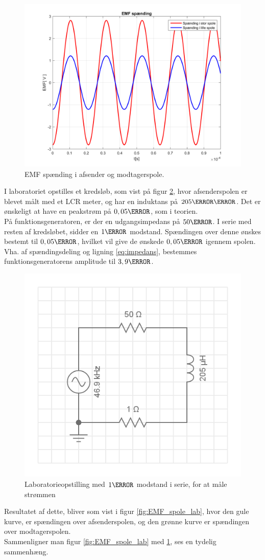 \begin{figure}[h!]
	\centering
	\includegraphics[width=1\textwidth]{billeder/EMF_spanding.png}
	\caption{EMF spænding i afsender og modtagerspole.}
	\label{fig:EMF_spole}
\end{figure}

I laboratoriet opstilles et kredsløb, som vist på figur \ref{fig:kredslob_spole}, hvor afsenderspolen er blevet målt med et LCR meter, og har en induktans på $205\micro\henry$.
Det er ønskeligt at have en peakstrøm på $0,05 \ampere$, som i teorien.\\
På funktionsgeneratoren, er der en udgangsimpedans på $50\ohm$.
I serie med resten af kredsløbet, sidder en $1\ohm$ modstand. Spændingen over denne ønskes bestemt til $0,05\volt$, hvilket vil give de ønskede $0,05\ampere$ igennem spolen.
Vha. af spændingsdeling og ligning \ref{eq:impedans}, bestemmes funktionsgeneratorens amplitude til $3,9\volt$.\\
\begin{figure}
	\centering
	\includegraphics[width=.5\textwidth]{billeder/circuit_spole.png}
	\caption{Laboratorieopstilling med $1\ohm$ modstand i serie, for at måle strømmen}
	\label{fig:kredslob_spole}
\end{figure}
Resultatet af dette, bliver som vist i figur \ref{fig:EMF_spole_lab}, hvor den gule kurve, er spændingen over afsenderspolen, og den grønne kurve er spændingen over modtagerspolen.\\
Sammenligner man figur \ref{fig:EMF_spole_lab} med \ref{fig:EMF_spole}, ses en tydelig sammenhæng.

